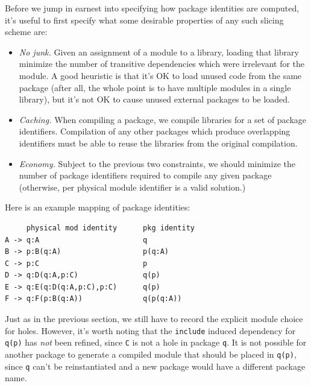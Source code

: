 \documentclass{article}
\begin{document}
Before we jump in earnest into specifying how package identities are
computed, it's useful to first specify what some desirable properties
of any such slicing scheme are:

\begin{itemize}

    \item \emph{No junk.} Given an assignment of a module to a library,
        loading that library minimize the number of transitive
        dependencies which were irrelevant for the module.  A good
        heuristic is that it's OK to load unused code from the same
        package (after all, the whole point is to have multiple modules
        in a single library), but it's not OK to cause unused external packages to
        be loaded.

    \item \emph{Caching.} When compiling a package, we compile libraries
        for a set of package identifiers. Compilation of any other
        packages which produce overlapping identifiers must be able to
        reuse the libraries from the original compilation.

    \item \emph{Economy.} Subject to the previous two constraints, we
        should minimize the number of package identifiers required
        to compile any given package (otherwise, per physical module
        identifier is a valid solution.)

\end{itemize}

Here is an example mapping of package identities:

\begin{verbatim}
     physical mod identity      pkg identity
A -> q:A                        q
B -> p:B(q:A)                   p(q:A)
C -> p:C                        p
D -> q:D(q:A,p:C)               q(p)
E -> q:E(q:D(q:A,p:C),p:C)      q(p)
F -> q:F(p:B(q:A))              q(p(q:A))
\end{verbatim}

Just as in the previous section, we still have to record the explicit
module choice for holes.  However, it's worth noting that the
\verb|include| induced dependency for \verb|q(p)| has \emph{not} been
refined, since \verb|C| is not a hole in package \verb|q|.  It is not
possible for another package to generate a compiled module that should
be placed in \verb|q(p)|, since \verb|q| can't be reinstantiated and a
new package would have a different package name.
\end{document}
